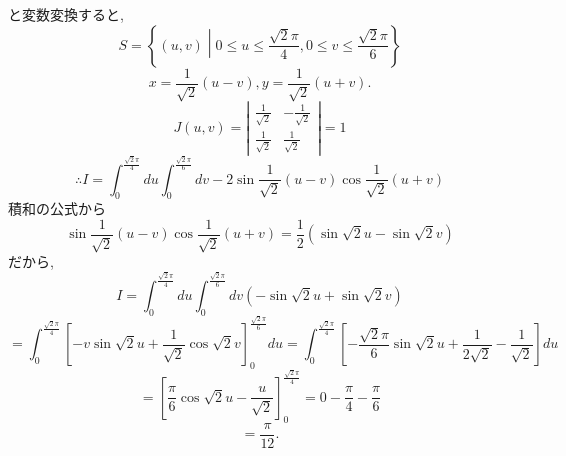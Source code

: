 \documentclass[a4paper,10pt,report]{amsart}
\theoremstyle{plain}
\theoremstyle{definition}
\theoremstyle{remark}
\begin{document}
\begin{enumerate}
        と変数変換すると, 
        \begin{equation*}
            S=\left\{(u,v)\middle| 0\leq u\leq\frac{\sqrt{2}\pi}{4},0\leq v\leq \frac{\sqrt{2}\pi}{6}\right\}
        \end{equation*}
        \begin{equation*}
            x=\frac{1}{\sqrt{2}}(u-v),y=\frac{1}{\sqrt{2}}(u+v).
        \end{equation*}
        \begin{equation*}
            J(u,v)=\left|\begin{array}{cc}
                \frac{1}{\sqrt{2}} & -\frac{1}{\sqrt{2}}\\
                \frac{1}{\sqrt{2}} & \frac{1}{\sqrt{2}}
            \end{array}\right|=1
        \end{equation*}
        \begin{equation*}
            \therefore I=\int_{0}^{\frac{\sqrt{2}\pi}{4}}du\int_{0}^{\frac{\sqrt{2}\pi}{6}}dv-2\sin{\frac{1}{\sqrt{2}}(u-v)}\cos{\frac{1}{\sqrt{2}}(u+v)}
        \end{equation*}
        積和の公式から
        \begin{equation*}
            \sin{\frac{1}{\sqrt{2}}(u-v)}\cos{\frac{1}{\sqrt{2}}(u+v)}=\frac{1}{2}(\sin{\sqrt{2}u}-\sin{\sqrt{2}v})
        \end{equation*}
        だから,
        \begin{equation*}
            I=\int_{0}^{\frac{\sqrt{2}\pi}{4}}du\int_{0}^{\frac{\sqrt{2}\pi}{6}}dv(-\sin{\sqrt{2}u}+\sin{\sqrt{2}v})
        \end{equation*}
        \begin{equation*}
            =\int_{0}^{\frac{\sqrt{2}\pi}{4}}{\left[-v\sin{\sqrt{2}u}+\frac{1}{\sqrt{2}}\cos{\sqrt{2}v}\right]}_{0}^{\frac{\sqrt{2}\pi}{6}}du=\int_{0}^{\frac{\sqrt{2}\pi}{4}}{\left[-\frac{\sqrt{2}\pi}{6}\sin{\sqrt{2}u}+\frac{1}{2\sqrt{2}}-\frac{1}{\sqrt{2}}\right]}du
        \end{equation*}
        \begin{equation*}
            =\left[\frac{\pi}{6}\cos{\sqrt{2}u}-\frac{u}{\sqrt{2}}\right]_{0}^{\frac{\sqrt{2}\pi}{4}}=0-\frac{\pi}{4}-\frac{\pi}{6}
        \end{equation*}
        \begin{equation*}
            =\frac{\pi}{12}.
        \end{equation*}
    \end{enumerate}
\end{document}
